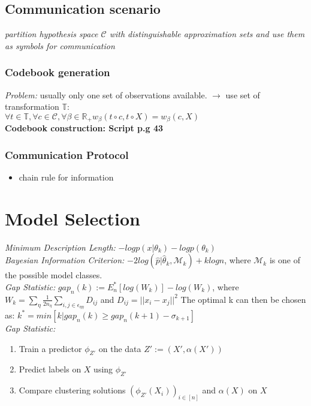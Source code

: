 \documentclass[9pt,parskip]{scrartcl}
\begin{document}
\begin{multicols*}{4}
\subsection*{Communication scenario}
\textit{partition hypothesis space $\mathcal{C}$ with distinguishable approximation sets and use them as symbols for communication}
\subsubsection*{Codebook generation}
\textit{Problem:} usually only one set of observations available. $\to$ use set of transformation $\mathbb{T}$: \\
$\forall t \in \mathbb{T}, \forall c \in \mathcal{C}, \forall{\beta} \in \mathbb{R}_{+} w_{\beta}(t \circ c, t \circ X) = w_{\beta}(c,X)$ \\
\textbf{Codebook construction: Script p.g 43}


\subsubsection*{Communication Protocol}

\vspace{5cm}
\begin{itemize}
	\item chain rule for information
\end{itemize}
\section*{Model Selection}
\textit{Minimum Description Length: } $-log p (x|\theta_k) - log p(\theta_k)$ \\

\textit{Bayesian Information Criterion:} $-2 log (\hat p | \hat \theta_k, \mathcal{M}_k)  + k log n$, where $\mathcal{M}_k$ is one of the possible model classes. \\
\textit{Gap Statistic:} $gap_n(k) := E_n^*[log(W_k)] - log(W_k)$, where $W_k = \sum_{\eta}\frac{1}{2n_{\eta}} \sum_{i,j \in \epsilon_{\eta \eta}} D_{ij}$ and $D_{ij} = ||x_i -x_j||^2$
The optimal k can then be chosen as: $k^* = min[k|gap_n(k) \geq gap_n(k+1) - \sigma_{k+1}]$ \\

\textit{Gap Statistic:}
\begin{enumerate}
    \item Train a predictor $\phi_{Z'}$ on the data $Z' := (X', \alpha(X'))$
    \item Predict labels on $X$ using $\phi_{Z'}$
    \item Compare clustering solutions $(\phi_{Z'}(X_i))_{i \in [n]}$ and $\alpha(X)$ on $X$
\end{enumerate}


\end{multicols*}
\end{document}
